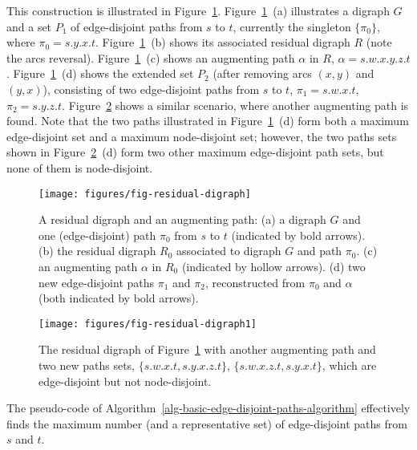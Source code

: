 \documentclass[preliminary,copyright,creativecommons]{eptcs}
\theoremstyle{remark}
\begin{document}
This construction is illustrated in Figure~\ref{fig-residual-digraph}.
Figure~\ref{fig-residual-digraph}~(a) illustrates a digraph $G$ and 
a set $P_1$ of edge-disjoint paths from $s$ to $t$,
currently the singleton $\{ \pi_0 \}$, where $\pi_0 = s.y.x.t$.
Figure~\ref{fig-residual-digraph}~(b) shows its associated residual digraph $R$ 
(note the arcs reversal).
Figure~\ref{fig-residual-digraph}~(c) shows an augmenting path $\alpha$ in $R$, 
$\alpha = s.w.x.y.z.t$.
Figure~\ref{fig-residual-digraph}~(d) shows the extended set $P_2$ 
(after removing arcs $(x,y)$ and $(y,x)$),
consisting of two edge-disjoint paths from $s$ to $t$, 
$\pi_1 = s.w.x.t$, $\pi_2 = s.y.z.t$.
Figure~\ref{fig-residual-digraph1} shows a similar scenario, 
where another augmenting path is found.
Note that the two paths illustrated in Figure~\ref{fig-residual-digraph}~(d)
form both a maximum edge-disjoint set and a maximum node-disjoint set;
however, the two paths sets shown in Figure~\ref{fig-residual-digraph1}~(d)
form two other maximum edge-disjoint path sets, but none of them is node-disjoint.

\begin{figure}[h]
\centerline{\texttt{[image: figures/fig-residual-digraph]}}
\caption{A residual digraph and an augmenting path: 
(a) a digraph $G$ and one (edge-disjoint) path $\pi_0$ from $s$ to $t$ (indicated by bold arrows).
(b) the residual digraph $R_0$ associated to digraph $G$ and path $\pi_0$.
(c) an augmenting path $\alpha$ in $R_0$  (indicated by hollow arrows).
(d) two new edge-disjoint paths $\pi_1$ and $\pi_2$,
reconstructed from $\pi_0$ and $\alpha$ (both indicated by bold arrows).}
\label{fig-residual-digraph}
\end{figure}

\begin{figure}[h]
\centerline{\texttt{[image: figures/fig-residual-digraph1]}}
\caption{The residual digraph of Figure~\ref{fig-residual-digraph} 
with another augmenting path and two new paths sets, 
$\{s.w.x.t, s.y.x.z.t\}$, $\{s.w.x.z.t, s.y.x.t\}$,
which are edge-disjoint but not node-disjoint.}
\label{fig-residual-digraph1}
\end{figure}

\newpage

The pseudo-code of Algorithm~\ref{alg-basic-edge-disjoint-paths-algorithm} 
effectively finds the maximum number (and a representative set) 
of edge-disjoint paths from $s$ and $t$. 
\end{document}
